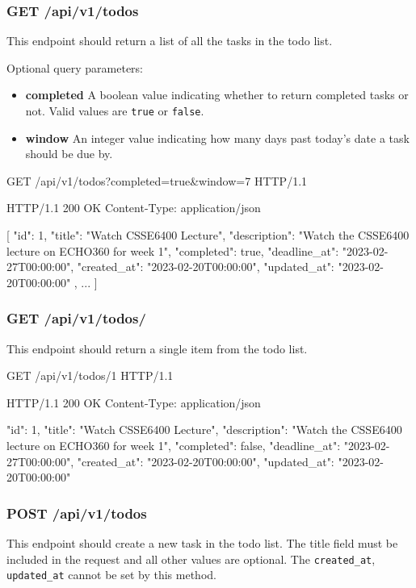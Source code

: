 \documentclass{csse4400}
\begin{document}
\subsubsection{GET /api/v1/todos}
This endpoint should return a list of all the tasks in the todo list.

Optional query parameters:
\begin{itemize}
\item \textbf{completed} A boolean value indicating whether to return completed tasks or not. Valid values are \texttt{true} or \texttt{false}.
  \item\textbf{window} An integer value indicating how many days past today's date a task should be due by.
\end{itemize}

\begin{code}[language=json,numbers=none]{}
GET /api/v1/todos?completed=true&window=7 HTTP/1.1
\end{code}
\begin{code}[language=json,numbers=none]{}
HTTP/1.1 200 OK
Content-Type: application/json

[
    {
      "id": 1,
      "title": "Watch CSSE6400 Lecture",
      "description": "Watch the CSSE6400 lecture on ECHO360 for week 1",
      "completed": true,
      "deadline_at": "2023-02-27T00:00:00",
      "created_at": "2023-02-20T00:00:00",
      "updated_at": "2023-02-20T00:00:00"
    },
    ...
]
\end{code}

\subsubsection{GET /api/v1/todos/}
This endpoint should return a single item from the todo list.

\begin{code}[language=json,numbers=none]{}
GET /api/v1/todos/1 HTTP/1.1
\end{code}
\begin{code}[language=json,numbers=none]{}
HTTP/1.1 200 OK
Content-Type: application/json

{
    "id": 1,
    "title": "Watch CSSE6400 Lecture",
    "description": "Watch the CSSE6400 lecture on ECHO360 for week 1",
    "completed": false,
    "deadline_at": "2023-02-27T00:00:00",
    "created_at": "2023-02-20T00:00:00",
    "updated_at": "2023-02-20T00:00:00"
}
\end{code}

\subsubsection{POST /api/v1/todos}
This endpoint should create a new task in the todo list. The title field must be included in the request and all other values are optional. The \texttt{created\_at}, \texttt{updated\_at} cannot be set by this method.
\end{document}
